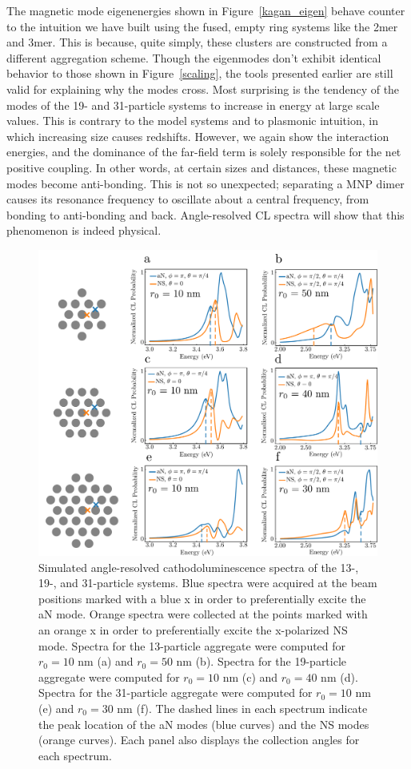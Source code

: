 \documentclass[journal=apchd5,manuscript=article]{achemso}
\begin{document}
The magnetic mode eigenenergies shown in Figure~\ref{kagan_eigen} behave counter to the intuition we have built using the fused, empty ring systems like the 2mer and 3mer. This is because, quite simply, these clusters are constructed from a different aggregation scheme. Though the eigenmodes don't exhibit identical behavior to those shown in Figure~\ref{scaling}, the tools presented earlier are still valid for explaining why the modes cross. Most surprising is the tendency of the modes of the 19- and 31-particle systems to increase in energy at large scale values. This is contrary to the model systems and to plasmonic intuition, in which increasing size causes redshifts. However, we again show the interaction energies, and the dominance of the far-field term is solely responsible for the net positive coupling. In other words, at certain sizes and distances, these magnetic modes become anti-bonding. This is not so unexpected; separating a MNP dimer causes its resonance frequency to oscillate about a central frequency, from bonding to anti-bonding and back\cite{vonPlessen2007}. Angle-resolved CL spectra will show that this phenomenon is indeed physical.

\begin{figure}
\includegraphics[width=6in]{kagan_CL_spectra.pdf}
\caption{Simulated angle-resolved cathodoluminescence spectra of the 13-, 19-, and 31-particle systems. Blue spectra were acquired at the beam positions marked with a blue x in order to preferentially excite the aN mode. Orange spectra were collected at the points marked with an orange x in order to preferentially excite the x-polarized NS mode. Spectra for the 13-particle aggregate were computed for $r_0 = 10$ nm (a) and $r_0 = 50$ nm (b). Spectra for the 19-particle aggregate were computed for $r_0 = 10$ nm (c) and $r_0 = 40$ nm (d). Spectra for the 31-particle aggregate were computed for $r_0 = 10$ nm (e) and $r_0 = 30$ nm (f). The dashed lines in each spectrum indicate the peak location of the aN modes (blue curves) and the NS modes (orange curves). Each panel also displays the collection angles for each spectrum.}
\label{kagan_CL}
\end{figure}
\end{document}
